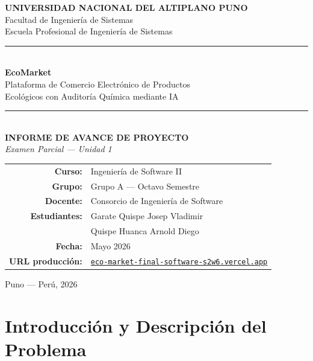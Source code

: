 \documentclass[12pt,a4paper]{article}
\begin{document}
\thispagestyle{empty}

\begin{center}
\vspace*{0.8cm}
{\Large\bfseries UNIVERSIDAD NACIONAL DEL ALTIPLANO PUNO}\\[0.3cm]
{\large Facultad de Ingenier\'ia de Sistemas}\\[0.1cm]
{\normalsize Escuela Profesional de Ingenier\'ia de Sistemas}\\[1.2cm]
\noindent\rule{7cm}{2pt}\\[1.5cm]
{\fontsize{40}{48}\selectfont\bfseries\color{ecogreen}EcoMarket}\\[0.6cm]
{\Large Plataforma de Comercio Electr\'onico de Productos}\\[0.2cm]
{\Large Ecol\'ogicos con Auditor\'ia Qu\'imica mediante IA}\\[1.2cm]
\noindent\rule{7cm}{0.5pt}\\[1cm]
{\large\bfseries INFORME DE AVANCE DE PROYECTO}\\[0.2cm]
{\normalsize\itshape Examen Parcial --- Unidad 1}\\[2cm]

\begin{tabular}{rl}
\textbf{Curso:}          & Ingenier\'ia de Software II \\[0.3cm]
\textbf{Grupo:}          & Grupo A --- Octavo Semestre \\[0.3cm]
\textbf{Docente:}        & Consorcio de Ingenier\'ia de Software \\[0.3cm]
\textbf{Estudiantes:}    & Garate Quispe Josep Vladimir \\
                         & Quispe Huanca Arnold Diego \\[0.3cm]
\textbf{Fecha:}          & Mayo 2026 \\[0.3cm]
\textbf{URL producci\'on:} &
  \href{https://eco-market-final-software-s2w6.vercel.app}%
       {\texttt{eco-market-final-software-s2w6.vercel.app}} \\
\end{tabular}

\vfill
{\small Puno --- Per\'u, 2026}
\end{center}

\newpage
\tableofcontents
\newpage

\section{Introducci\'on y Descripci\'on del Problema}
\end{document}
